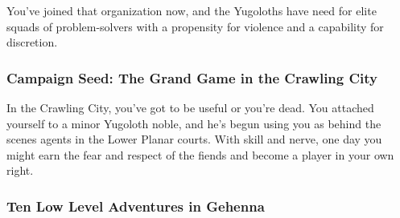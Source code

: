 You've joined that organization now, and the Yugoloths have need for elite squads of problem-solvers with a propensity for violence and a capability for discretion.

\subsubsection{Campaign Seed: The Grand Game in the Crawling City}

In the Crawling City, you've got to be useful or you're dead. You attached yourself to a minor Yugoloth noble, and he's begun using you as behind the scenes agents in the Lower Planar courts. With skill and nerve, one day you might earn the fear and respect of the fiends and become a player in your own right.

\subsubsection{Ten Low Level Adventures in Gehenna}

